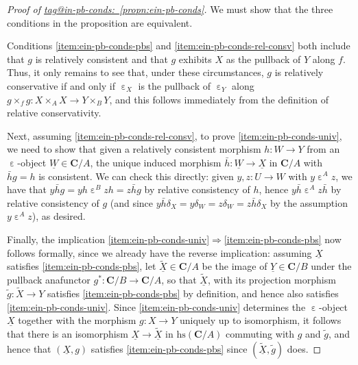 \documentclass{amsart}
\makeatletter
\newcommand\bC{\mathbf{C}}
\newcommand\ein{\mathrel{\varepsilon}}
\newcommand\hs{\mathrm{hs}}
\newcommand\To{\Rightarrow}
\newcommand\und[1]{\underline{#1}}
\newcommand\unein{{\ein}}
\newcommand\wt[1]{\widetilde{#1}}
\newcommand\tagword[1]{\csname tag@#1\endcsname}
\def\label@tag#1:#2\@nil{#1}
\newcommand\labeltag[1]{\label@tag#1:\@nil}
\newcommand\jref[1]{%
  \texorpdfstring%
    {\hyperref[#1]{\tagword{\labeltag{#1}}~\ref*{#1}}}%
    {\tagword{\labeltag{#1}}~\ref*{#1}}%
}
\theoremstyle{definition}
\theoremstyle{remark}
\theoremstyle{plainwithref}
\makeatother
\begin{document}
\begin{proof}[Proof of \jref{propn:ein-pb-conds}] \label{proof:ein-pb-conds}
  We must show that the three conditions in the proposition are equivalent.

  Conditions \ref{item:ein-pb-conds-pbs} and \ref{item:ein-pb-conds-rel-consv} both include that \( g \) is relatively consistent and that \( g \) exhibits \( X \) as the pullback of \( Y \) along \( f \).
  Thus, it only remains to see that, under these circumstances, \( g \) is relatively conservative if and only if \( \unein_X \) is the pullback of \( \unein_Y \) along \( g \times_f g \colon X \times_A X \to Y \times_B Y \), and this follows immediately from the definition of relative conservativity.

  Next, assuming \ref{item:ein-pb-conds-rel-consv}, to prove \ref{item:ein-pb-conds-univ}, we need to show that given a relatively consistent morphism \( h \colon W \to Y \) from an \( \unein \)-object \( \und W \in \bC / A \), the unique induced morphism \( \bar h \colon \und W \to \und X \) in \( \bC / A \) with \( \bar h g = h \) is consistent.
  We can check this directly: given \( y,z \colon U \to W \) with \( y \ein^A z \), we have that \( y \bar h g = y h \ein^B z h = z \bar h g \) by relative consistency of \( h \), hence \( y \bar h \ein^A z \bar h \) by relative consistency of \( g \) (and since \( y \bar h \delta_X = y \delta_W = z \delta_W = z \bar h \delta_X \) by the assumption \( y \ein^A z \)), as desired.

  Finally, the implication \ref{item:ein-pb-conds-univ}\( \To \)\ref{item:ein-pb-conds-pbs} now follows formally, since we already have the reverse implication: assuming \( \und X \) satisfies \ref{item:ein-pb-conds-pbs}, let \( \und{\wt X} \in \bC / A \) be the image of \( \und Y \in \bC / B \) under the pullback anafunctor \( g^* \colon \bC / B \to \bC / A \), so that \( \und{\wt X} \), with its projection morphism \( \tilde g \colon \wt X \to Y \) satisfies \ref{item:ein-pb-conds-pbs} by definition, and hence also satisfies \ref{item:ein-pb-conds-univ}.
  Since \ref{item:ein-pb-conds-univ} determines the \( \unein \)-object \( \und X \) together with the morphism \( g \colon X \to Y \) uniquely up to isomorphism, it follows that there is an isomorphism \( \und X \to \und{\wt X} \) in \( \hs(\bC / A) \) commuting with \( g \) and \( \tilde g \), and hence that \( (\und X, g) \) satisfies \ref{item:ein-pb-conds-pbs} since \( (\und{\wt X}, \tilde g) \) does.
\end{proof}
\end{document}
